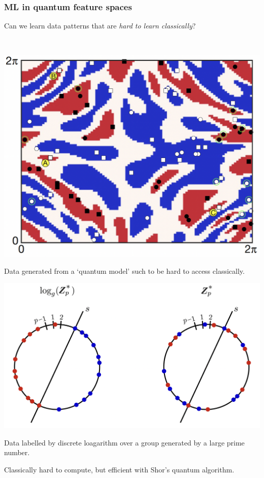 \documentclass{beamer}
\begin{document}
\begin{frame}
    \frametitle{ML in quantum feature spaces}

    Can we learn data patterns that are \emph{hard to learn classically}?

    \ \\
    \pause
    \begin{minipage}{.45\textwidth}
        \centering
        \includegraphics[width=.8\textwidth]{pics/havlicek-data.png}

    \end{minipage}
    \begin{minipage}{.45\textwidth}
        \small
        Data generated from a `quantum model' such to be hard to access classically.

    \end{minipage}
    
    \begin{minipage}{.45\textwidth}
        \centering
        \includegraphics[width=.8\textwidth]{pics/liu-temme-data.png}

    \end{minipage}
    \begin{minipage}{.45\textwidth}
        \small
        Data labelled by discrete loagarithm over a group generated by a large prime number.

        Classically hard to compute, but efficient with Shor's quantum algorithm.
    \end{minipage}

\end{frame}
\end{document}
